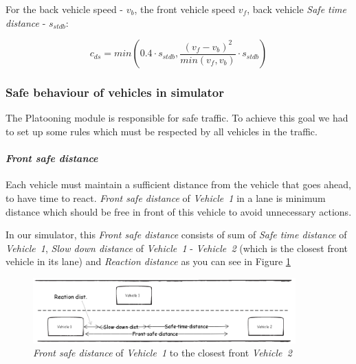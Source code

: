 \begin{itemize}
For the back vehicle speed - $v_b$, the front vehicle speed $v_f$, back vehicle \textit{Safe time distance} - $s_{stdb}$:

\begin{equation}
c_{ds}=min(0.4\cdot s_{stdb},\frac{(v_{f}-v_{b})^{2}}{min(v_{f},v_{b})}\cdot s_{stdb})\label{eq:cds}
\end{equation}

\end{itemize}

\subsubsection{Safe behaviour of vehicles in simulator}

The Platooning module is responsible for safe traffic. To achieve this goal we had to set up some rules which must be respected by all vehicles in the traffic.

\paragraph{\textit{Front safe distance}}

Each vehicle must maintain a sufficient distance from the vehicle that goes ahead, to have time to react. \textit{Front safe distance} of \textit{\mbox{Vehicle 1}} in a lane is minimum distance which should be free in front of this vehicle to avoid unnecessary actions.

In our simulator, this \textit{Front safe distance} consists of sum of \textit{Safe time distance} of \textit{\mbox{Vehicle 1}}, \textit{Slow down distance} of \textit{\mbox{Vehicle 1}} - \textit{\mbox{Vehicle 2}} (which is the closest front vehicle in its lane) and \textit{Reaction distance} as you can see in Figure \ref{fig:4_2_3_3-1}

\begin{figure}[ph]
\centering
\includegraphics[width=0.90\textwidth,height=0.90\textheight,keepaspectratio]{figures/Chapter_4/4_front_safe_distance.png}
\centering
\protect\caption{\label{fig:4_2_3_3-1}\textit{Front safe distance} of \textit{\mbox{Vehicle 1}} to the closest front \textit{\mbox{Vehicle 2}}}
\end{figure}

